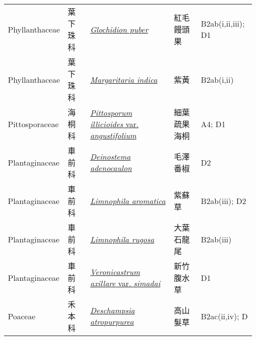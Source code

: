 {\begin{longtable}{L{2.5cm}L{2cm}L{5cm}L{2.5cm}L{3cm}}
    Phyllanthaceae & 葉下珠科 & \href{http://www.theplantlist.org/tpl1.1/search?q=Glochidion+puber}{\textit{Glochidion puber} } & 紅毛饅頭果 & B2ab(i,ii,iii); D1    \\
    Phyllanthaceae & 葉下珠科 & \href{http://www.theplantlist.org/tpl1.1/search?q=Margaritaria+indica}{\textit{Margaritaria indica} } & 紫黃 & B2ab(i,ii)    \\
    Pittosporaceae & 海桐科 & \href{http://www.theplantlist.org/tpl1.1/search?q=Pittosporum+illicioides+var.+angustifolium}{\textit{Pittosporum illicioides} var. \textit{angustifolium} } & 細葉疏果海桐 & A4; D1    \\
    Plantaginaceae & 車前科 & \href{http://www.theplantlist.org/tpl1.1/search?q=Deinostema+adenocaulon}{\textit{Deinostema adenocaulon} } & 毛澤番椒 & D2    \\
    Plantaginaceae & 車前科 & \href{http://www.theplantlist.org/tpl1.1/search?q=Limnophila+aromatica}{\textit{Limnophila aromatica} } & 紫蘇草 & B2ab(iii); D2    \\
    Plantaginaceae & 車前科 & \href{http://www.theplantlist.org/tpl1.1/search?q=Limnophila+rugosa}{\textit{Limnophila rugosa} } & 大葉石龍尾 & B2ab(iii)    \\
    Plantaginaceae & 車前科 & \href{http://www.theplantlist.org/tpl1.1/search?q=Veronicastrum+axillare+var.+simadai}{\textit{Veronicastrum axillare} var. \textit{simadai} } & 新竹腹水草 & D1    \\
    Poaceae & 禾本科 & \href{http://www.theplantlist.org/tpl1.1/search?q=Deschampsia+atropurpurea}{\textit{Deschampsia atropurpurea} } & 高山髮草 & B2ac(ii,iv); D    \\

\end{longtable}}
